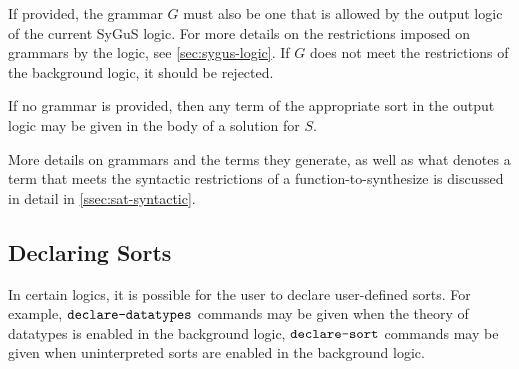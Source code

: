 \documentclass[english,a4paper,10pt]{article}
\begin{document}
\begin{itemize}
If provided, the grammar $G$ must also be one that is allowed
by the output logic of the current SyGuS logic.
For more details on the restrictions imposed on grammars by the logic,
see \cref{sec:sygus-logic}.
If $G$ does not meet the restrictions
of the background logic, it should be rejected.

If no grammar is provided,
then any term of the appropriate sort
in the output logic may be given in the body of a solution for $S$.

More details on grammars and the terms
they generate, as well as what denotes a term that meets the syntactic
restrictions of a function-to-synthesize
is discussed in detail in \cref{ssec:sat-syntactic}.

\begin{comment}
If $G$ is not provided,
then this command is syntax
sugar for
$\paren{\synthfunkwd\mbox{ }S\mbox{ }
\paren{\paren{x_1\mbox{ }\sigma_1} \ldots \paren{x_n\mbox{ }\sigma_n} }\mbox{ }\sigma\mbox{ }
G_{\mathcal{L},\vec{x},\sigma}}$
where $G_{\mathcal{L},\vec{x},\sigma}$ is a grammar that
generates all well-sorted terms of sort $\sigma$ 
that belong to the language of the current background logic $\mathcal{L}$,
and whose free variables are in $\vec{x} = (x_1, \ldots, x_n)$.
\end{comment}


\end{itemize}

\subsection{Declaring Sorts}
\label{ssec:declaring-sorts}

In certain logics, 
it is possible for the user to declare user-defined sorts.
For example, 
$\texttt{declare-datatypes}$ commands may be given
when the theory of datatypes is enabled in the background
logic,
$\texttt{declare-sort}$ commands may be given
when uninterpreted sorts are enabled in the background logic.
\end{document}
